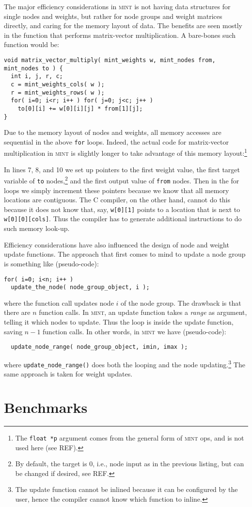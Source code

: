 \documentclass[12pt,letterpaper]{memoir}
\newcommand{\mint}{{\scshape\sffamily mint}\xspace}
\begin{document}
The major efficiency considerations in \mint is not having data
structures for single nodes and weights, but rather for node groups
and weight matrices directly, and caring for the memory layout of
data. The benefits are seen mostly in the function that performs
matrix-vector multiplication. A bare-bones such function would be:
\begin{lstlisting}
void matrix_vector_multiply( mint_weights w, mint_nodes from, mint_nodes to ) {
  int i, j, r, c;
  c = mint_weights_cols( w );
  r = mint_weights_rows( w );
  for( i=0; i<r; i++ ) for( j=0; j<c; j++ ) 
    to[0][i] += w[0][i][j] * from[1][j];
}  
\end{lstlisting}
Due to the memory layout of nodes and weights, all memory accesses are
sequential in the above \lstinline{for} loops. Indeed, the actual code
for matrix-vector multiplication in \mint is slightly longer to take
advantage of this memory layout:\footnote{The \lstinline{float *p}
  argument comes from the general form of \mint ops, and is not used
  here (see REF).}



In lines 7, 8, and 10 we set up pointers to the first weight value,
the first target variable of \lstinline{to} nodes,\footnote{By
  default, the target is 0, i.e., node input as in the previous
  listing, but can be changed if desired, see REF.} and the first
output value of \lstinline{from} nodes. Then in the for loops we
simply increment these pointers because we know that all memory
locations are contiguous. The C compiler, on the other hand, cannot do
this because it does not know that, say, \lstinline{w[0][1]} points to
a location that is next to \lstinline{w[0][0][cols]}. Thus the
compiler has to generate additional instructions to do such memory
look-up.

Efficiency considerations have also influenced the design of node and
weight update functions. The approach that first comes to mind to
update a node group is something like (pseudo-code):
\begin{lstlisting}
for( i=0; i<n; i++ )
  update_the_node( node_group_object, i );
\end{lstlisting}
where the function call updates node $i$ of the node group. The
drawback is that there are $n$ function calls. In \mint, an update
function takes a \textit{range} as argument, telling it which nodes to
update. Thus the loop is inside the update function, saving $n-1$
function calls. In other words, in \mint we have 
(pseudo-code):
\begin{lstlisting}
  update_node_range( node_group_object, imin, imax );
\end{lstlisting}
where \lstinline{update_node_range()} does both the looping and the
node updating.\footnote{The update function cannot be inlined because
  it can be configured by the user, hence the compiler cannot know
  which function to inline.} The same approach is taken for weight
updates.

\section{Benchmarks}

\clearpage

\printindex
\end{document}
